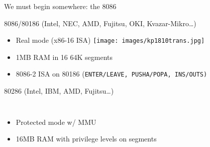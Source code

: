 \documentclass[xcolor={dvipsnames,table}]{beamer}
\begin{document}
\begin{frame}[t]{We must begin somewhere: the 8086}
\begin{block}{8086/80186 (Intel, NEC, AMD, Fujitsu, OKI, Kvazar-Mikro\ldots)}
\begin{itemize}
\item Real mode (x86-16 ISA) \hfill \texttt{[image: images/kp1810trans.jpg]}
\item 1MB RAM in 16 64K segments
\item 8086-2 ISA on 80186
{\footnotesize
(\tt{ENTER}/\tt{LEAVE}, \tt{PUSHA}/\tt{POPA}, \tt{INS}/\tt{OUTS})
}
\end{itemize}
\end{block}
\begin{block}{80286 (Intel, IBM, AMD, Fujitsu\ldots)}
\begin{columns}
\column{3.4in}
\begin{itemize}
\item Protected mode w/ MMU
\item 16MB RAM with privilege levels on segments
\end{itemize}
\column{.5in}
\end{columns}
\end{block}
\vfill
\begin{center}
\end{center}
\end{frame}
\end{document}
